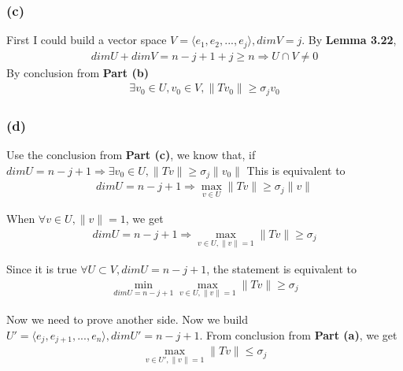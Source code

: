 \documentclass{article}
\begin{document}
\subsubsection*{(c)}
First I could build a vector space $V = \langle e_1, e_2, ..., e_j\rangle, dimV = j$. By \textbf{Lemma 3.22}, \begin{equation*}
    \begin{split}
        dimU + dimV = n - j + 1 + j \ge n \Rightarrow U \cap V \ne {0}
    \end{split}
\end{equation*}
By conclusion from \textbf{Part (b)}
\begin{equation*}
    \begin{split}
        \exists v_0 \in U, v_0 \in V, \|Tv_0\| \ge \sigma_j v_0
    \end{split}
\end{equation*}

\subsubsection*{(d)}
Use the conclusion from \textbf{Part (c)}, we know that, if $dimU = n - j + 1 \Rightarrow \exists v_0 \in U, \|Tv\| \ge \sigma_j\|v_0\|$
 This is equivalent to \begin{equation*}
     \begin{split}
         dimU = n - j + 1 \Rightarrow \mathop{max} \limits _{v \in U} \|Tv\| \ge \sigma_j\|v\|
     \end{split}
 \end{equation*}

 When $\forall v \in U, \|v\| = 1$, we get
 \begin{equation*}
    \begin{split}
        dimU = n - j + 1 \Rightarrow \mathop{max} \limits _{v \in U, \|v\| = 1} \|Tv\| \ge \sigma_j
    \end{split}
\end{equation*}

Since it is true $\forall U \subset V, dimU = n - j + 1$, the statement is equivalent to \begin{equation}
    \begin{split}
        \mathop{min} \limits_{dimU = n - j + 1} \mathop{max} \limits _{v \in U, \|v\| = 1} \|Tv\| \ge \sigma_j
    \end{split}
\end{equation}

Now we need to prove another side. Now we build $U' = \langle e_j, e_{j+1}, ..., e_n \rangle, dimU' = n - j + 1$. From conclusion from \textbf{Part (a)}, we get
\begin{equation}
    \begin{split}
        \mathop{max} \limits _{v \in U', \|v\| = 1} \|Tv\| \le \sigma_j
    \end{split}
\end{equation}
\end{document}
